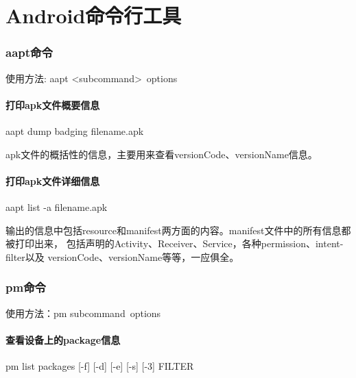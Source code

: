 ﻿\documentclass[a4paper,11pt]{article}
\begin{document}
  \tt %

  \pagestyle{header}
  \sybmaketitle
  \tableofcontents
  \newpage

  \pagestyle{main}
  \setcounter{page}{1}

  \part[Commands for Android]{Android命令行工具}
  \section[aapt - Android Asset Packaging Tool]{aapt命令}
  使用方法: aapt \textless subcommand\textgreater\ \lt options\gt
  \subsection[print apk file badging information]{打印apk文件概要信息}
  aapt dump badging filename.apk

  apk文件的概括性的信息，主要用来查看versionCode、versionName信息。

  \subsection[print apk file verbose information]{打印apk文件详细信息}
  aapt list -a filename.apk

  输出的信息中包括resource和manifest两方面的内容。manifest文件中的所有信息都被打印出来，
  包括声明的Activity、Receiver、Service，各种permission、intent-filter以及
  versionCode、versionName等等，一应俱全。

  \section[pm - Package Manager]{pm命令}
  使用方法：pm \lt subcommand\gt\ \lt options\gt

  \subsection[list packages]{查看设备上的package信息}
  pm list packages [-f] [-d] [-e] [-s] [-3] FILTER
\end{document}
